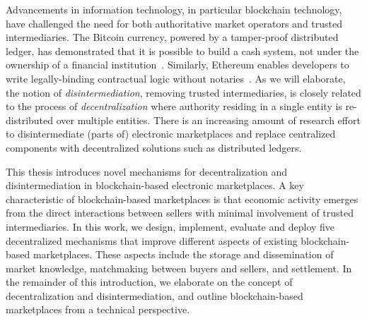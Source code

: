 Advancements in information technology, in particular blockchain technology, have challenged the need for both authoritative market operators and trusted intermediaries.
The Bitcoin currency, powered by a tamper-proof distributed ledger, has demonstrated that it is possible to build a cash system, not under the ownership of a financial institution~\cite{nakamoto2008bitcoin}.
Similarly, Ethereum enables developers to write legally-binding contractual logic without notaries~\cite{wood2014ethereum}.
As we will elaborate, the notion of \emph{disintermediation}, removing trusted intermediaries, is closely related to the process of \emph{decentralization} where authority residing in a single entity is re-distributed over multiple entities.
There is an increasing amount of research effort to disintermediate (parts of) electronic marketplaces and replace centralized components with decentralized solutions such as distributed ledgers.

This thesis introduces novel mechanisms for decentralization and disintermediation in blockchain-based electronic marketplaces.
A key characteristic of blockchain-based marketplaces is that economic activity emerges from the direct interactions between sellers with minimal involvement of trusted intermediaries.
In this work, we design, implement, evaluate and deploy five decentralized mechanisms that improve different aspects of existing blockchain-based marketplaces.
These aspects include the storage and dissemination of market knowledge, matchmaking between buyers and sellers, and settlement.
In the remainder of this introduction, we elaborate on the concept of decentralization and disintermediation, and outline blockchain-based marketplaces from a technical perspective.

